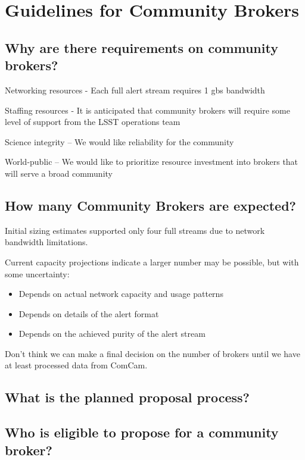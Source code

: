 \section{Guidelines for Community Brokers}

\subsection{Why are there requirements on community brokers?}

Networking resources - Each full alert stream requires 1 gbs bandwidth

Staffing resources - It is anticipated that community brokers will require some level of support from the LSST operations team

Science integrity – We would like reliability for the community

World-public – We would like to prioritize resource investment into brokers that will serve a broad community

\subsection{How many Community Brokers are expected?}

Initial sizing estimates supported only four full streams due to network bandwidth limitations.

Current capacity projections indicate a larger number may be possible, but with some uncertainty:

\begin{itemize}
	\item Depends on actual network capacity and usage patterns

	\item Depends on details of the alert format

	\item Depends on the achieved purity of the alert stream
\end{itemize}

Don’t think we can make a final decision on the number of brokers until we have at least processed data from ComCam.


\subsection{What is the planned proposal process?}

\subsection{Who is eligible to propose for a community broker?}

